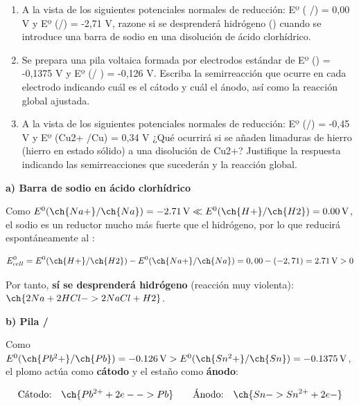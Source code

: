 \begin{exerciseEVAU}

    \begin{enumerate}[label=\letraminuscula]
        \item A la vista de los siguientes potenciales normales de reducción: Eº ( /) = 0,00 V y Eº (/) = -2,71 V, razone si se desprenderá hidrógeno () cuando se introduce una barra de sodio en una disolución
        de ácido clorhídrico.
        \item Se prepara una pila voltaica formada por electrodos estándar de Eº () = -0,1375 V y
        Eº (/ ) = -0,126 V. Escriba la semirreacción que ocurre en cada electrodo indicando cuál es el cátodo
        y cuál el ánodo, así como la reacción global ajustada.
        \item A la vista de los siguientes potenciales normales de reducción: Eº (/) = -0,45 V y
        Eº (Cu2+ /Cu) = 0,34 V ¿Qué ocurrirá si se añaden limaduras de hierro (hierro en estado sólido) a una
        disolución de Cu2+? Justifique la respuesta indicando las semirreacciones que sucederán y la reacción global.
    \end{enumerate}
    \begin{solu}

        \textbf{a) Barra de sodio en ácido clorhídrico}

        Como \(E^0(\ch{Na+}/\ch{Na}) = \SI{-2.71}{\volt} \ll E^0(\ch{H+}/\ch{H2}) = \SI{0.00}{\volt}\), el sodio es un reductor mucho más fuerte que el hidrógeno, por lo que reducirá espontáneamente al :

        \begin{equation*}
            E^0_{cell} = E^0(\ch{H+}/\ch{H2}) - E^0(\ch{Na+}/\ch{Na}) = 0,00-(-2,71) = \SI{2.71}{\volt} > 0
        \end{equation*}

        Por tanto, \textbf{sí se desprenderá hidrógeno} (reacción muy violenta): \(\ch{2 Na + 2 HCl -> 2 NaCl + H2}\).

        \textbf{b) Pila /}

        Como \(E^0(\ch{Pb^2+}/\ch{Pb}) = \SI{-0.126}{\volt} > E^0(\ch{Sn^2+}/\ch{Sn}) = \SI{-0.1375}{\volt}\), el plomo actúa como \textbf{cátodo} y el estaño como \textbf{ánodo}:

        \begin{equation*}
            \text{Cátodo:} \quad \ch{Pb^{2+} + 2 e- -> Pb} \qquad \text{Ánodo:} \quad \ch{Sn -> Sn^{2+} + 2 e-}
        \end{equation*}


\end{solu}
\end{exerciseEVAU}
